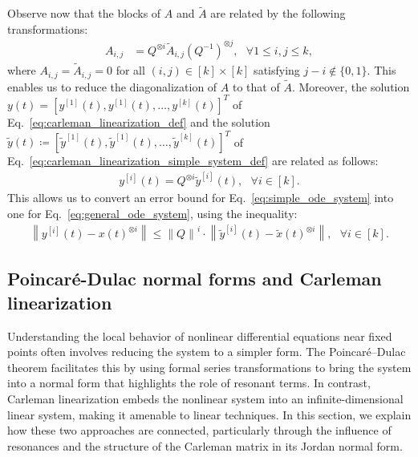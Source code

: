 \documentclass[superscriptaddress,onecolumn,nofootinbib,longbibliography,a4paper,accepted=2026-09-29]{quantumarticle}
\theoremstyle{plain}
\theoremstyle{definition}
\numberwithin{thm}{section}
\numberwithin{assumption}{section}
\numberwithin{lemma}{section}
\numberwithin{prop}{section}
\numberwithin{cor}{section}
\numberwithin{definition}{section}
\numberwithin{rmk}{section}
\numberwithin{equation}{section}
\newcommand{\norm}[1]     {\left\| #1 \right\|}
\newcommand{\defeq}{\coloneqq}
\begin{document}
Observe now that the blocks of $A$ and $\tilde{A}$ are related by the following transformations:
\begin{align}
A_{i,j}&=Q^{\otimes i} \tilde{A}_{i,j} (Q^{-1})^{\otimes j},~~~\forall 1\le i,j \le k,
\label{eq:aij_tildeaij_relation}
\end{align}
where $A_{i,j}=\tilde{A}_{i,j}=0$ for all $(i,j)\in [k] \times [k]$ satisfying $j-i \not\in \{0,1\}$. This enables us to reduce the diagonalization of $A$ to that of $\tilde{A}$. Moreover, the solution ${y}(t) = [{y}^{[1]}(t), {y}^{[1]}(t), \dots, {y}^{[k]}(t)]^T$ of Eq.~\eqref{eq:carleman_linearization_def} and
the solution $\tilde{y}(t) \defeq [\tilde{y}^{[1]}(t), \tilde{y}^{[1]}(t), \dots, \tilde{y}^{[k]}(t)]^T$ of Eq.~\eqref{eq:carleman_linearization_simple_system_def} are related as follows:
\begin{align}    
y^{[i]}(t) = Q^{\otimes i} \tilde{y}^{[i]}(t), ~~~\forall i \in [k]. 
\end{align}
This allows us to convert an error bound for  Eq.~\eqref{eq:simple_ode_system} into one for Eq.~\eqref{eq:general_ode_system}, using the inequality:
\begin{align}
\norm{{y}^{[i]}(t)-{x}(t)^{\otimes i}} \le  \norm{Q}^i \cdot  \norm{\tilde{y}^{[i]}(t)-\tilde{x}(t)^{\otimes i}}, ~~~\forall i \in [k].
\end{align}


\subsection{Poincar\'{e}-Dulac normal forms and Carleman linearization}
\label{subsec:poincare_dulac_carleman_relation}

Understanding the local behavior of nonlinear differential equations near fixed points often involves reducing the system to a simpler form. The Poincar\'{e}–Dulac theorem \cite{arnold2012geometrical} facilitates this by using formal series transformations to bring the system into a normal form that highlights the role of resonant terms. In contrast, Carleman linearization embeds the nonlinear system into an infinite-dimensional linear system, making it amenable to linear techniques. In this section, we explain how these two approaches are connected, particularly through the influence of resonances and the structure of the Carleman matrix in its Jordan normal form.
\end{document}
